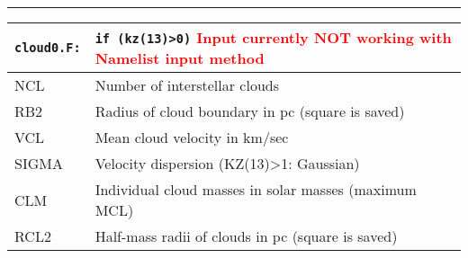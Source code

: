 \hrule
\noindent
\begin{longtable}{@{}p{1.5cm}p{13.0cm}}
\texttt{cloud0.F:}& \texttt{if (kz(13)>0)} 
\textcolor{red}{Input currently NOT working with Namelist input method}
\\\hline
%
NCL   &  Number of interstellar clouds \\
RB2   &  Radius of cloud boundary in pc (square is saved) \\
VCL   &  Mean cloud velocity in km/sec \\
SIGMA &  Velocity dispersion (KZ(13)>1: Gaussian) \\
CLM   &  Individual cloud masses in solar masses (maximum MCL) \\
RCL2  &  Half-mass radii of clouds in pc (square is saved) \\
\end{longtable}

